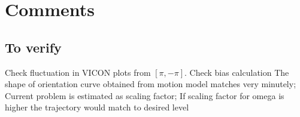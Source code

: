 \documentclass[12pt]{article}
\begin{document}
\section*{Comments}

\subsection*{To verify}

Check fluctuation in VICON plots from $[\pi, -\pi]$.
Check bias calculation
The shape of orientation curve obtained from motion model matches very minutely;
Current problem is estimated as scaling factor;
If scaling factor for omega is higher the trajectory would match to desired level
\end{document}
